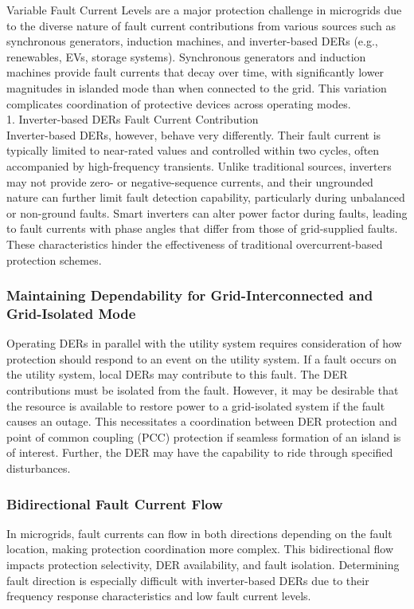 Variable Fault Current Levels are a major protection challenge in microgrids due to the diverse nature of fault current contributions from various sources such as synchronous generators, induction machines, and inverter-based DERs (e.g., renewables, EVs, storage systems).
Synchronous generators and induction machines provide fault currents that decay over time, with significantly lower magnitudes in islanded mode than when connected to the grid. This variation complicates coordination of protective devices across operating modes.\\

1. Inverter-based DERs Fault Current Contribution\\
Inverter-based DERs, however, behave very differently. Their fault current is typically limited to near-rated values and controlled within two cycles, often accompanied by high-frequency transients. Unlike traditional sources, inverters may not provide zero- or negative-sequence currents, and their ungrounded nature can further limit fault detection capability, particularly during unbalanced or non-ground faults. Smart inverters can alter power factor during faults, leading to fault currents with phase angles that differ from those of grid-supplied faults. These characteristics hinder the effectiveness of traditional overcurrent-based protection schemes.

\subsubsection{Maintaining Dependability for Grid-Interconnected and Grid-Isolated Mode} 

Operating DERs in parallel with the utility system requires consideration of how protection should respond to an event on the utility system. If a fault occurs on the utility system, local DERs may contribute to this fault. The DER contributions must be isolated from the fault. However, it may be desirable that the resource is available to restore power to a grid-isolated system if the fault causes an outage. This necessitates a coordination between DER protection and point of common coupling (PCC) protection if seamless formation of an island is of interest. Further, the DER may have the capability to ride through specified disturbances.


\subsubsection{Bidirectional Fault Current Flow}
 In microgrids, fault currents can flow in both directions depending on the fault location, making protection coordination more complex. This bidirectional flow impacts protection selectivity, DER availability, and fault isolation. Determining fault direction is especially difficult with inverter-based DERs due to their frequency response characteristics and low fault current levels.

